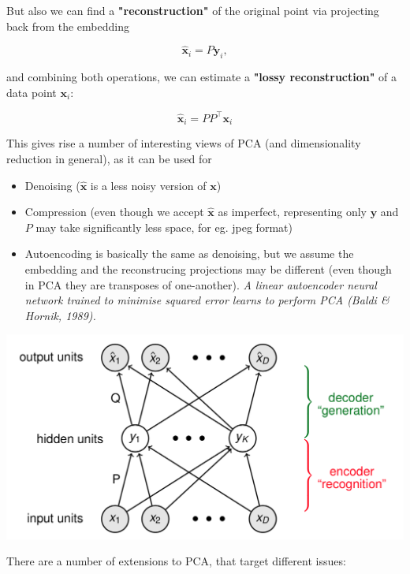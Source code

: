 \documentclass[11pt]{article}
\begin{document}
\begin{tcolorbox}[title=PCA uses \#2]

But also we can find a \textbf{"reconstruction"} of the original point via projecting back from the embedding

$$\hat{\mathbf{x}}_i = P \mathbf{y}_i, $$ 

and combining both operations, we can estimate a \textbf{"lossy reconstruction"} of a data point $\mathbf{x}_i$:

$$ \hat{\mathbf{x}}_i = P P^\top \mathbf{x}_i $$

This gives rise a number of interesting views of PCA (and dimensionality reduction in general), as it can be used for

\begin{itemize}
	\item Denoising ($\hat{\mathbf{x}}$ is a less noisy version of $\mathbf{x}$)
	\item Compression (even though we accept $\hat{\mathbf{x}}$ as imperfect, representing only $\mathbf{y}$ and $P$ may take significantly less space, for eg. jpeg format)
	\item Autoencoding is basically the same as denoising, but we assume the embedding and the reconstrucing projections may be different (even though in PCA they are transposes of one-another). \emph{A linear autoencoder neural network trained to minimise squared error learns to perform PCA (Baldi \& Hornik, 1989).}
\end{itemize}


\hspace{2cm}\includegraphics[width=0.8\linewidth]{dimred_pca_autoencode}	
\end{tcolorbox}

\clearpage

There are a number of extensions to PCA, that target different issues:
\end{document}
